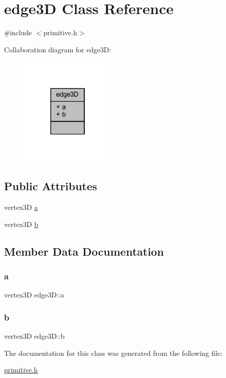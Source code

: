 \hypertarget{classedge3_d}{}\section{edge3D Class Reference}
\label{classedge3_d}


{\ttfamily \#include $<$primitive.\+h$>$}



Collaboration diagram for edge3D\+:
\nopagebreak
\begin{figure}[H]
\begin{center}
\leavevmode
\includegraphics[width=130pt]{classedge3_d__coll__graph}
\end{center}
\end{figure}
\subsection*{Public Attributes}
\begin{DoxyCompactItemize}
\item 
vertex3D \mbox{\hyperlink{classedge3_d_ac6e93edf5cf00d4f5384c747aa0e881f}{a}}
\item 
vertex3D \mbox{\hyperlink{classedge3_d_a2b8676adbcd52863011450e35c16f79b}{b}}
\end{DoxyCompactItemize}


\subsection{Member Data Documentation}
\mbox{\label{classedge3_d_ac6e93edf5cf00d4f5384c747aa0e881f}} 
\subsubsection{\texorpdfstring{a}{a}}
{\footnotesize\ttfamily vertex3D edge3\+D\+::a}

\mbox{\label{classedge3_d_a2b8676adbcd52863011450e35c16f79b}} 
\subsubsection{\texorpdfstring{b}{b}}
{\footnotesize\ttfamily vertex3D edge3\+D\+::b}



The documentation for this class was generated from the following file\+:\begin{DoxyCompactItemize}
\item 
\mbox{\hyperlink{primitive_8h}{primitive.\+h}}\end{DoxyCompactItemize}
